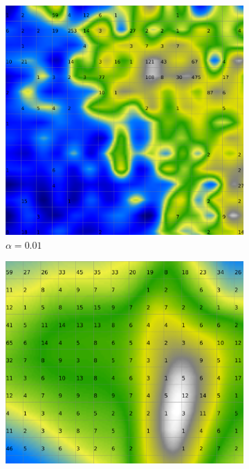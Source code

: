 \documentclass{acm_proc_article-sp}
\begin{document}
\begin{figure}
\centering
    \centering
    \begin{subfigure}[b]{0.24\linewidth}
        \includegraphics[width=\linewidth]{img/wine-20x16-smoothed-data-histogram-alpha-0,01-f-149}
        \caption{$\alpha=0.01$}
        \label{fig:wine-20x16-smoothed-data-histogram-alpha-0,01-f-149}
    \end{subfigure}
    \begin{subfigure}[b]{0.24\linewidth}
        \includegraphics[width=\linewidth]{img/wine-20x16-smoothed-data-histogram-alpha-0,45-f-149}

\end{subfigure}
\end{figure}
\end{document}
